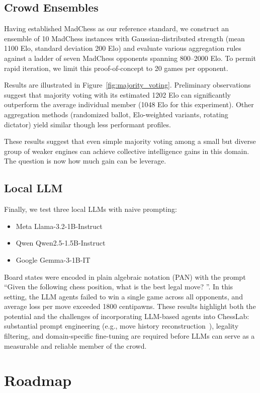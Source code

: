 \documentclass{article}
\begin{document}
\subsection{Crowd Ensembles}

Having established MadChess as our reference standard, we construct an ensemble of 10 MadChess instances with Gaussian-distributed strength (mean 1100 Elo, standard deviation 200 Elo) and evaluate various aggregation rules against a ladder of seven MadChess opponents spanning 800--2000 Elo.
To permit rapid iteration, we limit this proof-of-concept to 20 games per opponent.

Results are illustrated in Figure~\ref{fig:majority_voting}.
Preliminary observations suggest that majority voting with its estimated 1202 Elo can significantly outperform the average individual member (1048 Elo for this experiment).
Other aggregation methods (randomized ballot, Elo-weighted variants, rotating dictator) yield similar though less performant profiles.

These results suggest that even simple majority voting among a small but diverse group of weaker engines can achieve collective intelligence gains in this domain.
The question is now how much gain can be leverage.

\subsection{Local LLM}

Finally, we test three local LLMs with naive prompting:
\begin{itemize}
  \item Meta Llama-3.2-1B-Instruct
  \item Qwen Qwen2.5-1.5B-Instruct
  \item Google Gemma-3-1B-IT
\end{itemize}
Board states were encoded in plain algebraic notation (PAN) with the prompt ``Given the following chess position, what is the best legal move? ''.
In this setting, the LLM agents failed to win a single game across all opponents, and average loss per move exceeded 1800 centipawns.
These results highlight both the potential and the challenges of incorporating LLM-based agents into ChessLab: substantial prompt engineering (e.g., move history reconstruction~\cite{dynomight2024}), legality filtering, and domain-specific fine-tuning are required before LLMs can serve as a measurable and reliable member of the crowd.

\section{Roadmap}\label{sec:roadmap}
\end{document}
